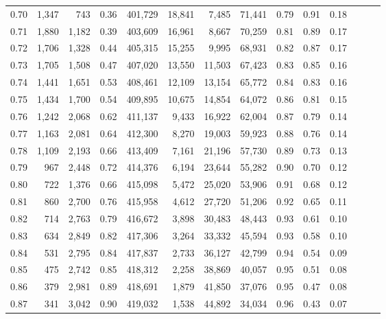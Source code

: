 \begin{tabular}{rrrrrrrrrrrrrr}
0.70 &   1,347 &    743 &  0.36 &  401,729 &   18,841 &   7,485 &  71,441 &  0.79 &  0.91 &      0.18 \\
0.71 &   1,880 &  1,182 &  0.39 &  403,609 &   16,961 &   8,667 &  70,259 &  0.81 &  0.89 &      0.17 \\
0.72 &   1,706 &  1,328 &  0.44 &  405,315 &   15,255 &   9,995 &  68,931 &  0.82 &  0.87 &      0.17 \\
0.73 &   1,705 &  1,508 &  0.47 &  407,020 &   13,550 &  11,503 &  67,423 &  0.83 &  0.85 &      0.16 \\
0.74 &   1,441 &  1,651 &  0.53 &  408,461 &   12,109 &  13,154 &  65,772 &  0.84 &  0.83 &      0.16 \\
0.75 &   1,434 &  1,700 &  0.54 &  409,895 &   10,675 &  14,854 &  64,072 &  0.86 &  0.81 &      0.15 \\
0.76 &   1,242 &  2,068 &  0.62 &  411,137 &    9,433 &  16,922 &  62,004 &  0.87 &  0.79 &      0.14 \\
0.77 &   1,163 &  2,081 &  0.64 &  412,300 &    8,270 &  19,003 &  59,923 &  0.88 &  0.76 &      0.14 \\
0.78 &   1,109 &  2,193 &  0.66 &  413,409 &    7,161 &  21,196 &  57,730 &  0.89 &  0.73 &      0.13 \\
0.79 &     967 &  2,448 &  0.72 &  414,376 &    6,194 &  23,644 &  55,282 &  0.90 &  0.70 &      0.12 \\
0.80 &     722 &  1,376 &  0.66 &  415,098 &    5,472 &  25,020 &  53,906 &  0.91 &  0.68 &      0.12 \\
0.81 &     860 &  2,700 &  0.76 &  415,958 &    4,612 &  27,720 &  51,206 &  0.92 &  0.65 &      0.11 \\
0.82 &     714 &  2,763 &  0.79 &  416,672 &    3,898 &  30,483 &  48,443 &  0.93 &  0.61 &      0.10 \\
0.83 &     634 &  2,849 &  0.82 &  417,306 &    3,264 &  33,332 &  45,594 &  0.93 &  0.58 &      0.10 \\
0.84 &     531 &  2,795 &  0.84 &  417,837 &    2,733 &  36,127 &  42,799 &  0.94 &  0.54 &      0.09 \\
0.85 &     475 &  2,742 &  0.85 &  418,312 &    2,258 &  38,869 &  40,057 &  0.95 &  0.51 &      0.08 \\
0.86 &     379 &  2,981 &  0.89 &  418,691 &    1,879 &  41,850 &  37,076 &  0.95 &  0.47 &      0.08 \\
0.87 &     341 &  3,042 &  0.90 &  419,032 &    1,538 &  44,892 &  34,034 &  0.96 &  0.43 &      0.07 \\

\end{tabular}
